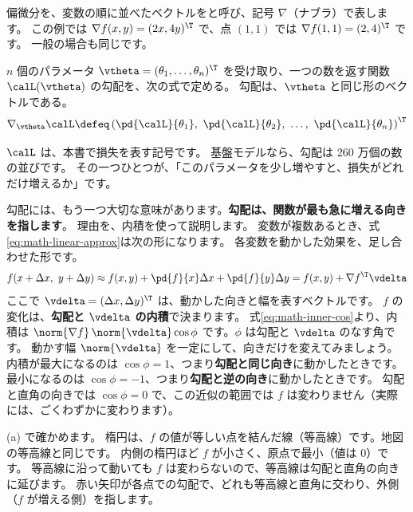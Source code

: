 偏微分を、変数の順に並べたベクトルをと呼び、記号 $\nabla$（ナブラ）で表します。
この例では $\nabla f(x,y)=(2x,4y)^\T$ で、点 $(1,1)$ では $\nabla f(1,1)=(2,4)^\T$ です。
一般の場合も同じです。

{%
\begin{definition}[勾配]\label{def:math-gradient}
$n$ 個のパラメータ $\vtheta=(\theta_1,\dots,\theta_n)^\T$ を受け取り、一つの数を返す関数 $\calL(\vtheta)$ の勾配を、次の式で定める。
勾配は、$\vtheta$ と同じ形のベクトルである。
\begin{equation}
\nabla_{\vtheta}\calL\defeq\left(\pd{\calL}{\theta_1},\ \pd{\calL}{\theta_2},\ \dots,\ \pd{\calL}{\theta_n}\right)^{\T}
\label{eq:math-gradient}
\end{equation}
\end{definition}}

$\calL$ は、本書で損失を表す記号です。
基盤モデルなら、勾配は 260 万個の数の並びです。
その一つひとつが、「このパラメータを少し増やすと、損失がどれだけ増えるか」です。

勾配には、もう一つ大切な意味があります。\textbf{勾配は、関数が最も急に増える向きを指します}。
理由を、内積を使って説明します。
変数が複数あるとき、式\eqref{eq:math-linear-approx}は次の形になります。
各変数を動かした効果を、足し合わせた形です。
\begin{equation}
f(x+\Delta x,\ y+\Delta y)\approx f(x,y)+\pd{f}{x}\Delta x+\pd{f}{y}\Delta y
= f(x,y)+\nabla f^{\T}\vdelta
\label{eq:math-linear-approx-multi}
\end{equation}
ここで $\vdelta=(\Delta x,\Delta y)^\T$ は、動かした向きと幅を表すベクトルです。
$f$ の変化は、\textbf{勾配と $\vdelta$ の内積}で決まります。
式\eqref{eq:math-inner-cos}より、内積は $\norm{\nabla f}\,\norm{\vdelta}\cos\phi$ です。$\phi$ は勾配と $\vdelta$ のなす角です。
動かす幅 $\norm{\vdelta}$ を一定にして、向きだけを変えてみましょう。
内積が最大になるのは $\cos\phi=1$、つまり\textbf{勾配と同じ向き}に動かしたときです。
最小になるのは $\cos\phi=-1$、つまり\textbf{勾配と逆の向き}に動かしたときです。
勾配と直角の向きでは $\cos\phi=0$ で、この近似の範囲では $f$ は変わりません（実際には、ごくわずかに変わります）。

(a) で確かめます。
楕円は、$f$ の値が等しい点を結んだ線（等高線）です。地図の等高線と同じです。
内側の楕円ほど $f$ が小さく、原点で最小（値は 0）です。
等高線に沿って動いても $f$ は変わらないので、等高線は勾配と直角の向きに延びます。
赤い矢印が各点での勾配で、どれも等高線と直角に交わり、外側（$f$ が増える側）を指します。

